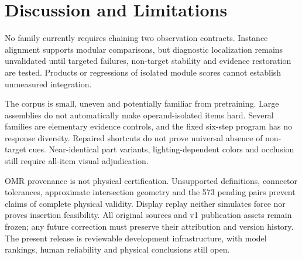 \documentclass[10pt,twocolumn,letterpaper]{article}
\begin{document}
\section{Discussion and Limitations}
No family currently requires chaining two observation contracts.
Instance alignment supports modular comparisons, but diagnostic
localization remains unvalidated until targeted failures, non-target
stability and evidence restoration are tested. Products or regressions
of isolated module scores cannot establish unmeasured integration.

The corpus is small, uneven and potentially familiar from pretraining.
Large assemblies do not automatically make operand-isolated items
hard. Several families are elementary evidence controls, and the
fixed six-step program has no response diversity. Repaired shortcuts
do not prove universal absence of non-target cues. Near-identical
part variants, lighting-dependent colors and occlusion still require
all-item visual adjudication.

OMR provenance is not physical certification. Unsupported definitions,
connector tolerances, approximate intersection geometry and the 573
pending pairs prevent claims of complete physical validity. Display
replay neither simulates force nor proves insertion feasibility.
All original sources and v1 publication assets remain frozen; any
future correction must preserve their attribution and version history.
The present release is reviewable development infrastructure, with
model rankings, human reliability and physical conclusions still open.



\end{document}
